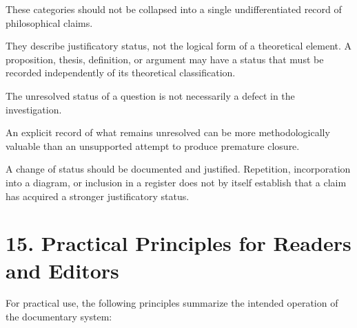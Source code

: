 These categories should not be collapsed into
a single undifferentiated record of philosophical
claims.

They describe justificatory status, not the
logical form of a theoretical element. A
proposition, thesis, definition, or argument
may have a status that must be recorded
independently of its theoretical classification.

The unresolved status of a question is not
necessarily a defect in the investigation.

An explicit record of what remains unresolved
can be more methodologically valuable than
an unsupported attempt to produce premature
closure.

A change of status should be documented
and justified. Repetition, incorporation
into a diagram, or inclusion in a register
does not by itself establish that a claim
has acquired a stronger justificatory status.


\section*{15. Practical Principles for Readers and Editors}

For practical use, the following principles
summarize the intended operation of the
documentary system:

